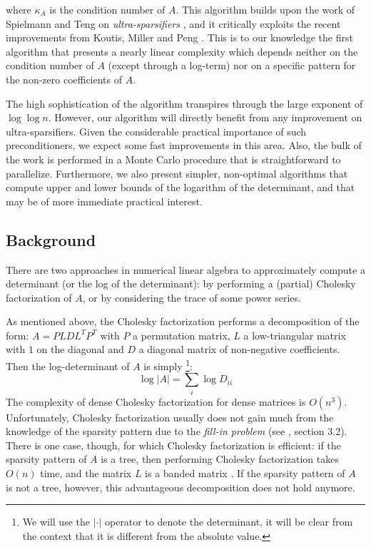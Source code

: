 where $\kappa_{A}$ is the condition number of $A$. This algorithm
builds upon the work of Spielmann and Teng on \emph{ultra-sparsifiers}
\cite{Spielman2009a}, and it critically exploits the recent improvements
from Koutis, Miller and Peng \cite{Koutis2010}. This is to our knowledge
the first algorithm that presents a nearly linear complexity which
depends neither on the condition number of $A$ (except through a
log-term) nor on a specific pattern for the non-zero coefficients
of $A$.

The high sophistication of the algorithm transpires through the large
exponent of $\log\log n$. However, our algorithm will directly benefit
from any improvement on ultra-sparsifiers. Given the considerable
practical importance of such preconditioners, we expect some fast
improvements in this area. Also, the bulk of the work is performed
in a Monte Carlo procedure that is straightforward to parallelize.
Furthermore, we also present simpler, non-optimal algorithms that
compute upper and lower bounds of the logarithm of the determinant,
and that may be of more immediate practical interest.


\subsection{Background}

There are two approaches in numerical linear algebra to approximately
compute a determinant (or the log of the determinant): by performing
a (partial) Cholesky factorization of $A$, or by considering the
trace of some power series.

As mentioned above, the Cholesky factorization performs a decomposition
of the form: $A=PLDL^{T}P^{T}$ with $P$ a permutation matrix, $L$
a low-triangular matrix with $1$ on the diagonal and $D$ a diagonal
matrix of non-negative coefficients. Then the log-determinant of $A$
is simply%
\footnote{We will use the $\left|\cdot\right|$ operator to denote the determinant,
it will be clear from the context that it is different from the absolute
value.%
}: 
\[
\log\left|A\right|=\sum_{i}\log D_{ii}
\]
The complexity of dense Cholesky factorization for dense matrices
is $O\left(n^{3}\right)$. Unfortunately, Cholesky factorization usually
does not gain much from the knowledge of the sparsity pattern due
to the \emph{fill-in problem} (see \cite{meurant1999computer}, section
3.2). There is one case, though, for which Cholesky factorization
is efficient: if the sparsity pattern of $A$ is a tree, then performing
Cholesky factorization takes $O\left(n\right)$ time, and the matrix
$L$ is a banded matrix \cite{liu1990eliminationtrees}. If the sparsity
pattern of $A$ is not a tree, however, this advantageous decomposition
does not hold anymore.

